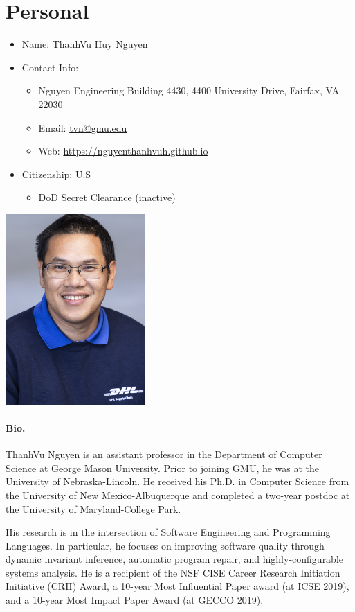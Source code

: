 \documentclass[10pt]{article}
\makeatletter
\newcommand{\myname}{ThanhVu Huy Nguyen}
\newcommand{\mynamevn}{Nguy$\tilde{\hat{\text{e}}}$n Huy ThanhV$\tilde{\text{u}}$}
\newcommand{\myemailwork}{tvn@gmu.edu}
\newcommand{\myweb}{https://nguyenthanhvuh.github.io}
\newcommand{\emailweb}{
\item Email: \href{mailto:\myemailwork}{\myemailwork}
\item Web: \url{\myweb}
}
\makeatother
\begin{document}
{
  \section{Personal}

  \begin{minipage}{.8\textwidth}
    \begin{itemize}
    \item Name: \myname{}
    \item Contact Info:
      \begin{itemize}
        \item Nguyen Engineering Building 4430, 4400 University Drive, Fairfax, VA 22030
        \emailweb{}
      \end{itemize}
    \item Citizenship: U.S
      \begin{itemize}
      \item DoD Secret Clearance (inactive)
      \end{itemize}
    \end{itemize}
  \end{minipage}
  \begin{minipage}{.3\textwidth}
    \includegraphics[width=0.4\textwidth]{tvn.png}
  \end{minipage}

  \paragraph{Bio.} ThanhVu Nguyen is an assistant professor in the Department of Computer Science at George Mason University. 
  Prior to joining GMU, he was at the University of Nebraska-Lincoln. He received his Ph.D. in Computer Science from the University of New Mexico-Albuquerque and completed a two-year postdoc at the University of Maryland-College Park.

  His research is in the intersection of Software Engineering and Programming Languages. In particular, he focuses on improving software quality through dynamic invariant inference,  automatic program repair, and highly-configurable systems analysis.
He is a recipient of the NSF CISE Career Research Initiation Initiative (CRII) Award, a 10-year Most Influential Paper award (at ICSE 2019), and a 10-year Most Impact Paper Award (at GECCO 2019).
}
\end{document}
